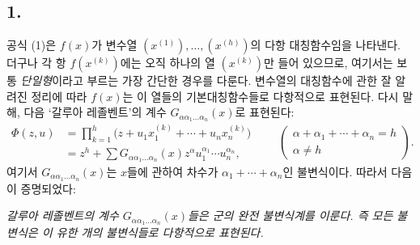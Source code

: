 
\subsection*{1.}
공식 (1)은 $f(x)$가 변수열 $(x^{(1)}),\ldots,(x^{(h)})$의 다항 대칭함수임을 나타낸다. 더구나 각 항 $f(x^{(k)})$에는 오직 하나의 열 $(x^{(k)})$만 들어 있으므로, 여기서는 보통 \emph{단일형}이라고 부르는 가장 간단한 경우를 다룬다. 변수열의 대칭함수에 관한 잘 알려진 정리에 따라 $f(x)$는 이 열들의 기본대칭함수들로 다항적으로 표현된다. 다시 말해, 다음 ‘갈루아 레졸벤트’의 계수 $G_{\alpha\alpha_1\ldots\alpha_n}(x)$로 표현된다:
\[
\begin{aligned}
  \Phi(z,u)
  &=\prod_{k=1}^{h}\bigl(z+u_1x_1^{(k)}+\cdots+u_nx_n^{(k)}\bigr) \\
  &=z^h+
    \sum G_{\alpha\alpha_1\ldots\alpha_n}(x)
    z^{\alpha}u_1^{\alpha_1}\cdots u_n^{\alpha_n},
\end{aligned}
\qquad
\left(\begin{array}{c}
\alpha+\alpha_1+\cdots+\alpha_n=h\\
\alpha\ne h
\end{array}\right).
\]
여기서 $G_{\alpha\alpha_1\ldots\alpha_n}(x)$는 $x$들에 관하여 차수가 $\alpha_1+\cdots+\alpha_n$인 불변식이다. 따라서 다음이 증명되었다:

\emph{갈루아 레졸벤트의 계수 $G_{\alpha\alpha_1\ldots\alpha_n}(x)$들은 군의 완전 불변식계를 이룬다. 즉 모든 불변식은 이 유한 개의 불변식들로 다항적으로 표현된다.}
